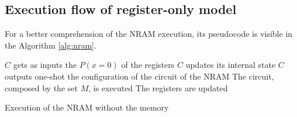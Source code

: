 \subsection{Execution flow of register-only model}\label{subsec:execution-register-only}
For a better comprehension of the NRAM execution, its pseudocode is visible in the Algorithm \ref{alg:nram}.
\begin{algorithm}
	\begin{algorithmic}[1]
		\label{lst:nram:line-5}
			\State $C$ gets as inputs the $P( x = 0 )$ of the registers\label{lst:nram:line-6}
				\State $C$ updates its internal state
			\EndIf
			\State $C$ outputs one-shot the configuration of the circuit of the NRAM
			\label{lst:nram:line-8}
			\State The circuit, composed by the set $M$, is executed \label{lst:nram:line-9}
			\State The registers are updated\label{lst:nram:line-10}
		\EndFor
	\end{algorithmic}
	\caption{Execution of the NRAM without the memory}\label{alg:nram}
\end{algorithm}

